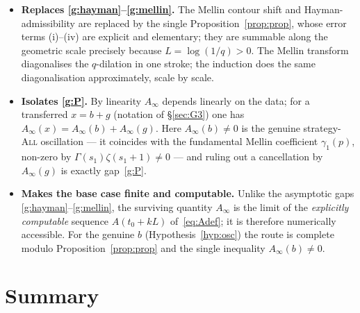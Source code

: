 \documentclass[11pt]{article}
\theoremstyle{definition}
\newcommand{\All}{\textsc{All}}
\begin{document}
\begin{itemize}[leftmargin=1.6em]
\item \textbf{Replaces \ref{g:hayman}--\ref{g:mellin}.} The Mellin
  contour shift and Hayman-admissibility are replaced by the single
  Proposition~\ref{prop:prop}, whose error terms (i)--(iv) are
  explicit and elementary; they are summable along the geometric
  scale precisely because $L=\log(1/q)>0$. The Mellin transform
  diagonalises the $q$-dilation in one stroke; the induction does the
  same diagonalisation approximately, scale by scale.
\item \textbf{Isolates \ref{g:P}.} By linearity $A_\infty$ depends
  linearly on the data; for a transferred $x=b+g$ (notation of
  \S\ref{sec:G3}) one has $A_\infty(x)=A_\infty(b)+A_\infty(g)$.
  Here $A_\infty(b)\ne0$ is the genuine strategy-\All{} oscillation
  --- it coincides with the fundamental Mellin coefficient
  $\gamma_1(p)$, non-zero by $\Gamma(s_1)\zeta(s_1+1)\ne0$ --- and
  ruling out a cancellation by $A_\infty(g)$ is exactly
  gap~\ref{g:P}.
\item \textbf{Makes the base case finite and computable.} Unlike the
  asymptotic gaps \ref{g:hayman}--\ref{g:mellin}, the surviving
  quantity $A_\infty$ is the limit of the \emph{explicitly
  computable} sequence $A(t_0+kL)$ of~\eqref{eq:Adef}; it is
  therefore numerically accessible. For the genuine $b$
  (Hypothesis~\ref{hyp:osc}) the route is complete modulo
  Proposition~\ref{prop:prop} and the single inequality
  $A_\infty(b)\ne0$.
\end{itemize}

\section{Summary}\label{sec:summary}
\end{document}
